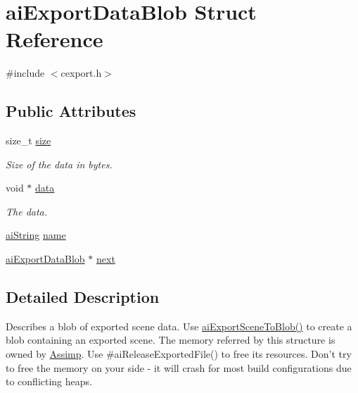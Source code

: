 \hypertarget{structaiExportDataBlob}{\section{ai\-Export\-Data\-Blob \-Struct \-Reference}
\label{structaiExportDataBlob}
}


{\ttfamily \#include $<$cexport.\-h$>$}

\subsection*{\-Public \-Attributes}
\begin{DoxyCompactItemize}
\item 
\hypertarget{structaiExportDataBlob_a339bfaacc70396b2f99f94c1bc3b808f}{size\-\_\-t \hyperlink{structaiExportDataBlob_a339bfaacc70396b2f99f94c1bc3b808f}{size}}\label{structaiExportDataBlob_a339bfaacc70396b2f99f94c1bc3b808f}

\begin{DoxyCompactList}\small\item\em \-Size of the data in bytes. \end{DoxyCompactList}\item 
\hypertarget{structaiExportDataBlob_ac080c780dad92077b42447d77a1a9ed1}{void $\ast$ \hyperlink{structaiExportDataBlob_ac080c780dad92077b42447d77a1a9ed1}{data}}\label{structaiExportDataBlob_ac080c780dad92077b42447d77a1a9ed1}

\begin{DoxyCompactList}\small\item\em \-The data. \end{DoxyCompactList}\item 
\hyperlink{structaiString}{ai\-String} \hyperlink{structaiExportDataBlob_a22fbdb28a7ebc30b4d3c3339be18b5f2}{name}
\item 
\hyperlink{structaiExportDataBlob}{ai\-Export\-Data\-Blob} $\ast$ \hyperlink{structaiExportDataBlob_a73baa3d77f95f360540b0b1922075ba5}{next}
\end{DoxyCompactItemize}


\subsection{\-Detailed \-Description}
\-Describes a blob of exported scene data. \-Use \hyperlink{cexport_8h_a33b02f2dbfd79980bf29e62f3a64139f}{ai\-Export\-Scene\-To\-Blob()} to create a blob containing an exported scene. \-The memory referred by this structure is owned by \hyperlink{namespaceAssimp}{\-Assimp}. \-Use \#ai\-Release\-Exported\-File() to free its resources. \-Don't try to free the memory on your side -\/ it will crash for most build configurations due to conflicting heaps.

